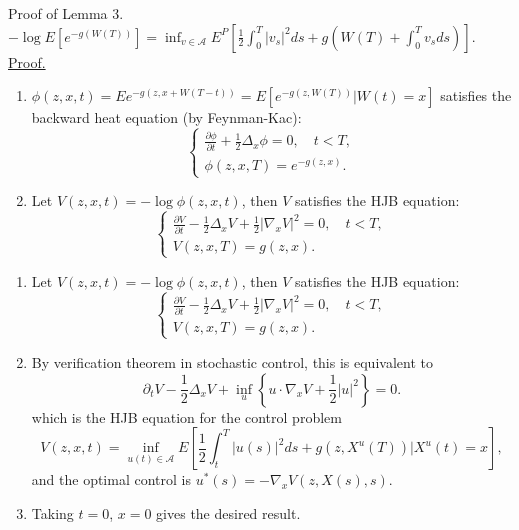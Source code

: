 \documentclass{if-beamer}
\begin{document}
\begin{frame}{Proof of Lemma 3. $ -\log E\left[e^{-g(W(T))}\right] = \inf_{v \in \mathcal{A}} E^P\left[ \frac{1}{2} \int_0^T |v_s|^2 ds + g\left( W(T) + \int_0^{T} v_s ds \right) \right].$}
    \underline{Proof.} 
    \begin{enumerate}
        \item $\phi(z, x, t) = E e^{-g(z, x + W(T - t))} = E [e^{-g(z, W(T))} | W(t) = x]$ satisfies the backward heat equation (by Feynman-Kac):
        \[
            \begin{cases}
                \frac{\partial \phi}{\partial t} + \frac{1}{2} \Delta_x \phi = 0, \quad t < T,\\
                \phi(z, x, T) = e^{-g(z, x)}.
            \end{cases}
        \]
        \item Let $V(z, x, t) = -\log \phi(z, x, t)$, then $V$ satisfies the HJB equation:
        \[
            \begin{cases}
                \frac{\partial V}{\partial t} - \frac{1}{2} \Delta_x V + \frac{1}{2} |\nabla_x V|^2 = 0, \quad t < T,\\
                V(z, x, T) = g(z, x).
            \end{cases}
        \]
        
    \end{enumerate}

\end{frame}

\begin{frame}
    \begin{enumerate}[<+->]
        \item[2] Let $V(z, x, t) = -\log \phi(z, x, t)$, then $V$ satisfies the HJB equation:
        \[
            \begin{cases}
                \frac{\partial V}{\partial t} - \frac{1}{2} \Delta_x V + \frac{1}{2} |\nabla_x V|^2 = 0, \quad t < T,\\
                V(z, x, T) = g(z, x).
            \end{cases}
        \]
        \item[3] By verification theorem in stochastic control, this is equivalent to
        \[
            \partial_t V - \frac{1}{2} \Delta_x V + \inf_{u} \left\{ u \cdot \nabla_x V + \frac{1}{2} |u|^2 \right\} = 0.
        \]
        which is the HJB equation for the control problem
        \[
            V(z, x, t) = \inf_{u(t) \in \mathcal{A}} E\left[ \frac{1}{2} \int_t^T |u(s)|^2 ds + g\left( z, X^{u}(T) \right) \Big| X^{u}(t) = x \right],
        \]
        and the optimal control is $u^*(s) = -\nabla_x V(z, X(s), s)$.
        \item[4] Taking $t=0$, $x=0$ gives the desired result.
    \end{enumerate}
\end{frame}
\end{document}

